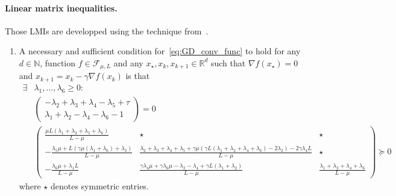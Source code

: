 \documentclass[nonacm]{acmart}
\renewcommand{\geq}{\geqslant}
\renewcommand{\succeq}{\succcurlyeq}
\begin{document}
\paragraph{Linear matrix inequalities.} Those LMIs are developped using the technique from~\cite{taylor2017smooth}.
\begin{enumerate}
	\item A necessary and sufficient condition for~\eqref{eq:GD_conv_func} to hold for any $d\in\mathbb{N}$, function $f\in\mathcal{F}_{\mu,L}$ and any $x_\star,x_k,x_{k+1}\in\mathbb{R}^d$ such that $\nabla f(x_\star)=0$ and $x_{k+1}=x_k-\gamma\nabla f(x_k)$ is that
	\begin{equation*}
\begin{aligned}
\exists &\lambda_1,\ldots,\lambda_6\geq 0:\\
&\begin{pmatrix}
-\lambda_2+\lambda_3+\lambda_4-\lambda_5+\tau\\\lambda_1+\lambda_2-\lambda_4-\lambda_6-1
\end{pmatrix}=0\\
&\begin{pmatrix}
 \frac{\mu  L (\lambda_1+\lambda_3+\lambda_5+\lambda_6)}{L-\mu } & \star &  \star \\
 -\frac{\lambda_5 \mu +L (\gamma  \mu  (\lambda_1+\lambda_6)+\lambda_3)}{L-\mu} & \frac{\lambda_2+\lambda_3+\lambda_4+\lambda_5+\gamma  \mu  (\gamma  L (\lambda_1+\lambda_2+\lambda_4+\lambda_6)-2 \lambda_2)-2 \gamma  \lambda_4 L}{L-\mu } & \star \\
 -\frac{\lambda_6 \mu +\lambda_1 L}{L-\mu } & \frac{\gamma  \lambda_4 \mu +\gamma  \lambda_6 \mu -\lambda_2-\lambda_4+\gamma  L (\lambda_1+\lambda_2)}{L-\mu } & \frac{\lambda_1+\lambda_2+\lambda_4+\lambda_6}{L-\mu }
\end{pmatrix}\succeq 0
\end{aligned}
\end{equation*}
where $\star$ denotes symmetric entries.


\end{enumerate}
\end{document}
